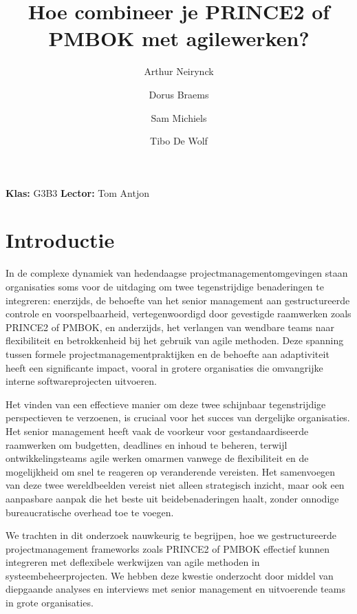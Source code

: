 \documentclass[dutch]{hogent-article}
\title{Hoe combineer je PRINCE2 of PMBOK met agile\linebreak werken?}
\author{Arthur Neirynck}
\author{Dorus Braems}
\author{Sam Michiels}
\author{Tibo De Wolf}
\begin{document}
\begin{abstract}

\end{abstract}
\bigskip
\textbf{Klas:} G3B3
\newline
\textbf{Lector:} Tom Antjon

\newpage

\tableofcontents
\pagebreak

\section{Introductie}%
\label{sec:introductie}

In de complexe dynamiek van hedendaagse projectmanagementomgevingen staan organisaties soms voor de uitdaging om twee tegenstrijdige benaderingen te integreren: enerzijds, de behoefte van het senior management aan gestructureerde controle en voorspelbaarheid, vertegenwoordigd door gevestigde raamwerken zoals PRINCE2 of PMBOK, en anderzijds, het verlangen van wendbare teams naar flexibiliteit en betrokkenheid bij het gebruik van agile methoden. Deze spanning tussen formele projectmanagementpraktijken en de behoefte aan adaptiviteit heeft een significante impact, vooral in grotere organisaties die omvangrijke interne softwareprojecten uitvoeren.
\newline

Het vinden van een effectieve manier om deze twee schijnbaar tegenstrijdige perspectieven te verzoenen, is cruciaal voor het succes van dergelijke organisaties. Het senior management heeft vaak de voorkeur voor gestandaardiseerde raamwerken om budgetten, deadlines en inhoud te beheren, terwijl ontwikkelingsteams agile werken omarmen vanwege de flexibiliteit en de mogelijkheid om snel te reageren op veranderende vereisten. Het samenvoegen van deze twee wereldbeelden vereist niet alleen strategisch inzicht, maar ook een aanpasbare aanpak die het beste uit beide\linebreak benaderingen haalt, zonder onnodige bureaucratische overhead toe te voegen.
\newline

We trachten in dit onderzoek nauwkeurig te begrijpen, hoe we gestructureerde \linebreak projectmanagement frameworks zoals PRINCE2 of PMBOK effectief kunnen integreren met de\linebreak flexibele werkwijzen van agile methoden in systeembeheerprojecten. We hebben deze kwestie onderzocht door middel van diepgaande analyses en interviews met senior management en \linebreak uitvoerende teams in grote organisaties.
\newline
\end{document}

